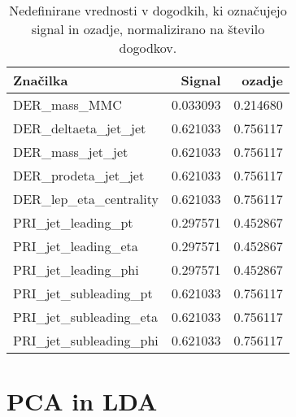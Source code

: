 \begin{table}[ht]
	\centering
	\begin{tabular}{lrr}
		\hline
		\textbf{Značilka} &         \textbf{Signal} &         \textbf{ozadje} \\
		\hline
		DER\_mass\_MMC           &  0.033093 &  0.214680 \\
		DER\_deltaeta\_jet\_jet   &  0.621033 &  0.756117 \\
		DER\_mass\_jet\_jet       &  0.621033 &  0.756117 \\
		DER\_prodeta\_jet\_jet    &  0.621033 &  0.756117 \\
		DER\_lep\_eta\_centrality &  0.621033 &  0.756117 \\
		PRI\_jet\_leading\_pt     &  0.297571 &  0.452867 \\
		PRI\_jet\_leading\_eta    &  0.297571 &  0.452867 \\
		PRI\_jet\_leading\_phi    &  0.297571 &  0.452867 \\
		PRI\_jet\_subleading\_pt  &  0.621033 &  0.756117 \\
		PRI\_jet\_subleading\_eta &  0.621033 &  0.756117 \\
		PRI\_jet\_subleading\_phi &  0.621033 &  0.756117 \\
	\end{tabular}
	\caption{Nedefinirane vrednosti v dogodkih, ki označujejo signal in ozadje, normalizirano na število dogodkov.}
	\label{unknown_values}
\end{table}

\section{PCA in LDA}

